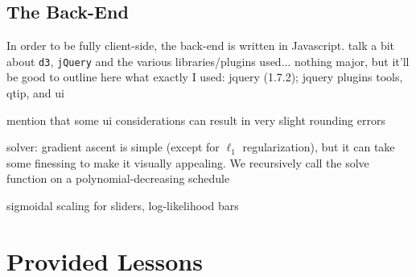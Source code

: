 \documentclass[11pt,letterpaper]{article}
\begin{document}

\subsection{The Back-End}
In order to be fully client-side, the back-end is written in Javascript. talk a bit about {\tt d3}, {\tt jQuery} and the various libraries/plugins used... nothing major, but it'll be good to outline here what exactly I used: jquery (1.7.2); jquery plugins tools, qtip, and ui

mention that some ui considerations can result in very slight rounding errors

solver: gradient ascent is simple (except for $\ell_1$ regularization), but it can take some finessing to make it visually appealing. We recursively call the solve function on a polynomial-decreasing schedule

sigmoidal scaling for sliders, log-likelihood bars

\section{Provided Lessons}\label{sec:lessons}
\end{document}
